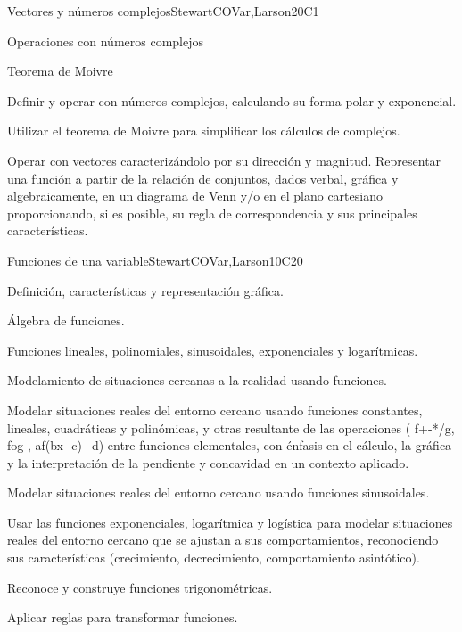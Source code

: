 \begin{syllabus}
\begin{unit}{Vectores y números complejos}{}{StewartCOVar,Larson}{20}{C1}
   \begin{topics}
      \item Operaciones con números complejos
      \item Teorema de Moivre
   \end{topics}

   \begin{learningoutcomes}
      \item Definir y operar con números complejos, calculando su forma polar y exponencial.
      \item Utilizar el teorema de Moivre para simplificar los cálculos de complejos.
      \item Operar con vectores caracterizándolo por su dirección y magnitud.  Representar una función a partir de la relación de conjuntos,  dados verbal, gráfica y algebraicamente,  en un diagrama de Venn  y/o en el plano cartesiano proporcionando, si es posible, su regla de correspondencia  y sus principales características.
   \end{learningoutcomes}
\end{unit}

\begin{unit}{Funciones de una variable}{}{StewartCOVar,Larson}{10}{C20}
   \begin{topics}
      \item Definición, características y representación gráfica.
      \item Álgebra de funciones.
      \item Funciones lineales, polinomiales, sinusoidales, exponenciales y logarítmicas.
      \item Modelamiento de situaciones cercanas a la realidad usando funciones.
   \end{topics}

   \begin{learningoutcomes}
      \item Modelar situaciones reales del entorno cercano usando funciones constantes, lineales, cuadráticas y polinómicas, y otras resultante de las operaciones ( f+-*/g, fog  , af(bx -c)+d) entre funciones elementales, con énfasis en el cálculo, la gráfica y la interpretación de la pendiente y concavidad en un contexto aplicado. 
      \item Modelar situaciones reales del entorno cercano usando funciones sinusoidales.
      \item Usar las funciones exponenciales, logarítmica y logística para modelar situaciones reales del entorno cercano que se ajustan a sus comportamientos, reconociendo sus características (crecimiento, decrecimiento, comportamiento asintótico).
      \item Reconoce y construye funciones trigonométricas.
      \item Aplicar reglas para transformar funciones.
   \end{learningoutcomes}
\end{unit}


\end{syllabus}
